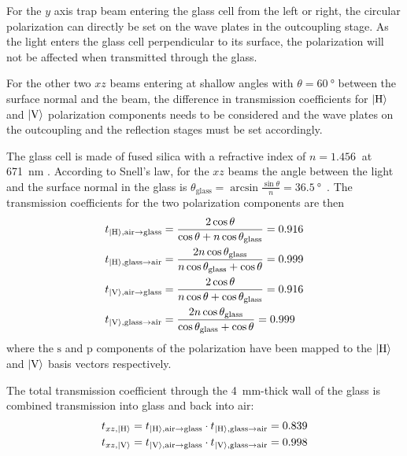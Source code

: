 For the $y$ axis trap beam entering the glass cell from the left or right, the circular polarization can directly be set on the wave plates in the outcoupling stage. As the light enters the glass cell perpendicular to its surface, the polarization will not be affected when transmitted through the glass.

For the other two $xz$ beams entering at shallow angles with $\theta = \SI{60}{\degree}$ between the surface normal and the beam, the difference in transmission coefficients for $\Ket{\text{H}}$ and $\Ket{\text{V}}$ polarization components needs to be considered and the wave plates on the outcoupling and the reflection stages must be set accordingly.

The glass cell is made of fused silica with a refractive index of $n = \SI{1.456}{}$ at \SI{671}{\nano\meter} \cite{malitson_interspecimen_1965}. According to Snell's law, for the $xz$ beams the angle between the light and the surface normal in the glass is $\theta_\text{glass} = \arcsin \frac{\sin \theta}{n} = \SI{36.5}{\degree}$~\cite{demtroder_elektromagnetische_2013}. The transmission coefficients for the two polarization components are then~\cite{demtroder_elektromagnetische_2013}
\begin{align}\label{eq:fresnel}
    \begin{split}
        t_{\Ket{\text{H}}, \text{air} \rightarrow \text{glass}} &= \frac{2 \cos \theta}{\cos \theta + n \cos \theta_\text{glass}} =  \SI{0.916}{}\\
        t_{\Ket{\text{H}}, \text{glass} \rightarrow \text{air}} &= \frac{2n \cos \theta_\text{glass}}{n \cos \theta_\text{glass} + \cos \theta} = \SI{0.999}{} \\
        t_{\Ket{\text{V}}, \text{air} \rightarrow \text{glass}} &= \frac{2 \cos \theta}{n \cos \theta + \cos \theta_\text{glass}} = \SI{0.916}{}\\ 
        t_{\Ket{\text{V}}, \text{glass} \rightarrow \text{air}} &= \frac{2 n \cos \theta_\text{glass}}{\cos \theta_\text{glass} + \cos \theta} = \SI{0.999}{}\\ 
    \end{split}
\end{align}
where the $\text{s}$ and $\text{p}$ components of the polarization have been mapped to the $\Ket{\text{H}}$ and $\Ket{\text{V}}$ basis vectors respectively.

The total transmission coefficient through the \SI{4}{\milli\meter}-thick wall of the glass is combined transmission into glass and back into air:
\begin{align}
    \begin{split}
        t_{xz, \Ket{\text{H}}} &= t_{\Ket{\text{H}}, \text{air} \rightarrow \text{glass}}  \cdot t_{\Ket{\text{H}}, \text{glass} \rightarrow \text{air}} = \SI{0.839}{} \\
        t_{xz, \Ket{\text{V}}} &= t_{\Ket{\text{V}}, \text{air} \rightarrow \text{glass}}  \cdot t_{\Ket{\text{V}}, \text{glass} \rightarrow \text{air}} = \SI{0.998}{}
    \end{split}
\end{align}

